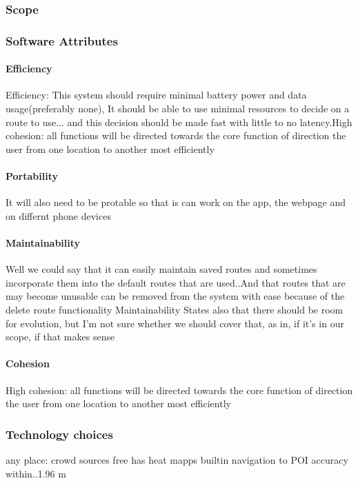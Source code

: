 \subsubsection{Scope}


\subsubsection{Software Attributes}

	\paragraph{Efficiency}

	Efficiency: This system should require minimal battery power and data usage(preferably none), It should be able to use minimal resources to decide on a route to use... and this decision should be made fast with little to no latency.High cohesion: all functions will be directed towards the core function of direction the user from one location to another most efficiently

	\paragraph{Portability}

	It will also need to be protable so that is can work on the app, the webpage and on differnt phone devices

	\paragraph{Maintainability}

	Well we could say that it can easily maintain saved routes and sometimes incorporate them into the default routes that are used..And that routes that are may become unusable can be removed from the system with ease because of the delete route functionality
	Maintainability States also that there should be room for evolution, but I'm not sure whether we should cover that, as in, if it's in our scope, if that makes sense

	\paragraph{Cohesion}

	High cohesion: all functions will be directed towards the core function of direction the user from one location to another most efficiently

\subsubsection{Technology choices}
	any place:
	crowd sources 
	free
	has heat mapps
	builtin navigation to POI
	accuracy within..1.96 m
	

